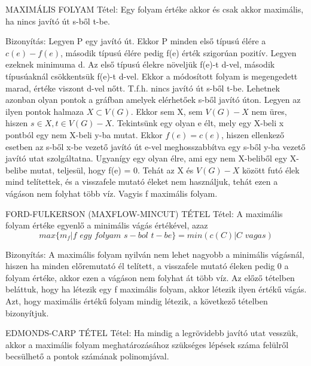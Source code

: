 \begin{tetel}{
MAXIMÁLIS FOLYAM Tétel}: Egy folyam értéke akkor és csak akkor maximális, ha nincs javító út s-ből t-be.
\end{tetel}
\begin{leftbar}
Bizonyítás: Legyen P egy javító út. Ekkor P minden első típusú élére a $c(e) - f(e)$, második típusú élére pedig f(e) érték szigorúan pozitív. Legyen ezeknek minimuma d. Az első típusú élekre növeljük f(e)-t d-vel, második típusúaknál csökkentsük f(e)-t d-vel. Ekkor a módosított folyam is megengedett marad, értéke viszont d-vel nőtt. T.f.h. nincs javító út s-ből t-be. Lehetnek azonban olyan pontok a gráfban amelyek elérhetőek s-ből javító úton. Legyen az ilyen pontok halmaza $X \subset V(G)$. Ekkor sem X, sem $V(G) - X$ nem üres, hiszen $s \in X, t\in V(G) - X$. Tekintsünk egy olyan e élt, mely egy X-beli x pontból egy nem X-beli y-ba mutat. Ekkor $f(e) = c(e)$, hiszen ellenkező esetben az s-ből x-be vezető javító út e-vel meghosszabbítva egy s-ből y-ba vezető javító utat szolgáltatna. Ugyanígy egy olyan élre, ami egy nem X-beliből egy X-belibe mutat, teljesül, hogy f(e) = 0. Tehát az X és $V(G) - X$ között futó élek mind telítettek, és a visszafele mutató éleket nem használjuk, tehát ezen a vágáson nem folyhat több víz. Vagyis f maximális folyam.
\end{leftbar}
\begin{tetel}{
FORD-FULKERSON (MAXFLOW-MINCUT) TÉTEL Tétel}: A maximális folyam értéke egyenlő a minimális vágás értékével, azaz
$$max\{m_f|f\,\,egy\,\,folyam\,\,s-bol\,\,t-be\} = min(c(C)|C\,\,vagas)$$
\end{tetel}
\begin{leftbar}
Bizonyítás: A maximális folyam nyilván nem lehet nagyobb a minimális vágásnál, hiszen ha minden előremutató él telített, a visszafele mutató éleken pedig 0 a folyam értéke, akkor ezen a vágáson nem folyhat át több víz. Az előző tételben beláttuk, hogy ha létezik egy f maximális folyam, akkor létezik ilyen értékű vágás. Azt, hogy maximális értékű folyam mindig létezik, a következő tételben bizonyítjuk.
\end{leftbar}
\begin{tetel}{
EDMONDS-CARP TÉTEL Tétel}: Ha mindig a legrövidebb javító utat vesszük, akkor a maximális folyam meghatározásához szükséges lépések száma felülről becsülhető a pontok számának polinomjával.
\end{tetel}
